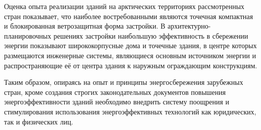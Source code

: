 Оценка опыта реализации зданий на арктических территориях рассмотренных стран показывает, что наиболее востребованными являются точечная компактная и блокированная ветрозащитная форма
застройки. В архитектурно-планировочных решениях застройки наибольшую эффективность в сбережении энергии показывают ширококорпусные дома
и точечные здания, в центре которых размещаются инженерные системы, являющиеся основным источником энергии и распространяющие её от центра здания
к наружным ограждающим конструкциям.

Таким образом, опираясь на опыт и принципы энергосбережения зарубежных стран, кроме создания строгих законодательных документов повышения энергоэффективности зданий
необходимо внедрить систему поощрения и стимулирования использования энергоэффективных технологий как юридических, так и физических лиц.


